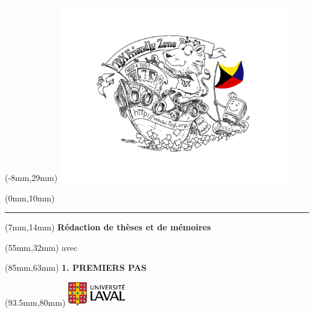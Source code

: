 
\begin{frame}[plain]
  \begin{textblock*}{100mm}(-8mm,29mm)
    \includegraphics[width=100mm,keepaspectratio]{TeXFZoneColor}
  \end{textblock*}

  \begin{textblock*}{107mm}(0mm,10mm)
    \rule[0mm]{107mm}{13mm}
  \end{textblock*}

  \begin{textblock*}{98mm}(7mm,14mm)
    \color{white}
    \fontsize{17pt}{18pt}\selectfont\bfseries%
    Rédaction de thèses et de mémoires
  \end{textblock*}

  \begin{textblock*}{70mm}(55mm,32mm)
    \color{black}
    \fontsize{17pt}{18pt}\selectfont%
    avec\;\;
    \fontsize{60pt}{60pt}\selectfont%
    \raisebox{-1.07ex}{\LaTeX}
  \end{textblock*}

  \begin{textblock*}{30mm}(85mm,63mm)
    \small\bfseries%
    1. PREMIERS PAS
  \end{textblock*}

  \begin{textblock*}{25mm}(93.5mm,80mm)
    \includegraphics[width=25mm,keepaspectratio]{ul_p}
  \end{textblock*}
\end{frame}
